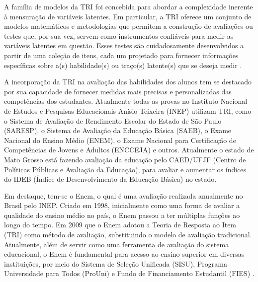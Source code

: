 A família de modelos da TRI foi concebida para abordar a complexidade inerente à mensuração de variáveis latentes. Em particular, a TRI oferece um conjunto de modelos matemáticos e metodologias que permitem a construção de avaliações ou testes que, por sua vez, servem como instrumentos confiáveis para medir as variáveis latentes em questão. Esses testes são cuidadosamente desenvolvidos a partir de uma coleção de itens, cada um projetado para fornecer informações específicas sobre a(s) habilidade(s) ou traço(s) latente(s) que se deseja medir \cite{pasquali2018}.

A incorporação da TRI na avaliação das habilidades dos alunos tem se destacado por sua capacidade de fornecer medidas mais precisas e personalizadas das competências dos estudantes. Atualmente todas as provas no Instituto Nacional de Estudos e Pesquisas Educacionais Anísio Teixeira (INEP) utilizam TRI, como o Sistema de Avaliação de Rendimento Escolar do Estado de São Paulo (SARESP), o Sistema de Avaliação da Educação Básica (SAEB), o Exame Nacional do Ensino Médio (ENEM), o Exame Nacional para Certificação de Competências de Jovens e Adultos (ENCCEJA) e outros. Atualmente o estado de Mato Grosso está fazendo avaliação da educação pelo CAED/UFJF (Centro de Políticas Públicas e Avaliação da Educação), para avaliar e aumentar os índices do IDEB (Índice de Desenvolvimento da Educação Básica) no estado.

Em destaque, tem-se o Enem, o qual é uma avaliação realizada anualmente no Brasil pelo INEP. Criado em 1998, inicialmente como uma forma de avaliar a qualidade do ensino médio no país, o Enem passou a ter múltiplas funções ao longo do tempo. Em 2009 que o Enem adotou a Teoria de Resposta ao Item (TRI) como método de avaliação, substituindo o modelo de avaliação tradicional. Atualmente, além de servir como uma ferramenta de avaliação do sistema educacional, o Enem é fundamental para acesso ao ensino superior em diversas instituições, por meio do Sistema de Seleção Unificada (SISU), Programa Universidade para Todos (ProUni) e Fundo de Financiamento Estudantil (FIES) \cite{inephistorico}.



  

